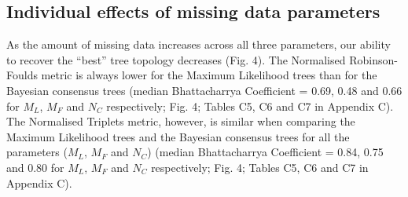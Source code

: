 \documentclass[12pt,letterpaper]{article}
\begin{document}


\subsection{Individual effects of missing data parameters}
As the amount of missing data increases across all three parameters, our ability to recover the ``best'' tree topology decreases (Fig. 4).
The Normalised Robinson-Foulds metric is always lower for the Maximum Likelihood trees than for the Bayesian consensus trees (median Bhattacharrya Coefficient = 0.69, 0.48 and 0.66 for $M_{L}$, $M_{F}$ and $N_{C}$ respectively; Fig. 4; Tables C5, C6 and C7 in Appendix C). 
The Normalised Triplets metric, however, is similar when comparing the Maximum Likelihood trees and the Bayesian consensus trees for all the parameters ($M_{L}$, $M_{F}$ and $N_{C}$) (median Bhattacharrya Coefficient = 0.84, 0.75 and 0.80 for $M_{L}$, $M_{F}$ and $N_{C}$ respectively; Fig. 4; Tables C5, C6 and C7 in Appendix C).
\end{document}
